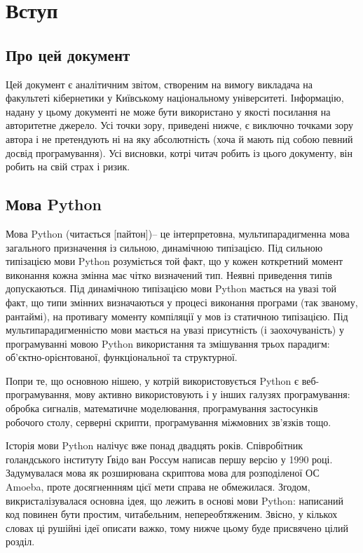 \documentclass[a4paper, 12pt]{article}
\begin{document}
\section{Вступ}

\subsection{Про цей документ}

Цей документ є аналітичним звітом, створеним на вимогу викладача на факультеті кібернетики у Київському національному університеті. Інформацію, надану у цьому документі не може бути використано у якості посилання на авторитетне джерело. Усі точки зору, приведені нижче, є виключно точками зору автора і не претендують ні на яку абсолютність (хоча й мають під собою певний досвід програмування). Усі висновки, котрі читач робить із цього документу, він робить на свій страх і ризик. 

\subsection{Мова Python}

Мова Python (читається [пайтон])-- це інтерпретовна, мультипарадигменна мова загального призначення із сильною, динамічною типізацією. Під сильною типізацією мови Python розуміється той факт, що у кожен коткретний момент виконання кожна змінна має чітко визначений тип. Неявні приведення типів допускаються. Під динамічною типізацією мови Python мається на увазі той факт, що типи змінних визначаються у процесі виконання програми (так званому, рантаймі), на противагу моменту компіляції у мов із статичною типізацією. Під мультипарадигменністю мови мається на увазі присутність (і заохочуваність) у програмуванні мовою Python використання та змішування трьох парадигм: об'єктно-орієнтованої, функціональної та структурної.

Попри те, що основною нішею, у котрій використовується Python є веб-програмування, мову активно використовують і у інших галузях програмування: обробка сигналів, математичне моделювання, програмування застосунків робочого столу, серверні скрипти, програмування міжмовних зв'язків тощо.

Історія мови Python налічує вже понад двадцять років. Співробітник голандського інституту Ґвідо ван Россум написав першу версію у 1990 році. Задумувалася мова як розширювана скриптова мова для розподіленої ОС Amoeba, проте досягненнням цієї мети справа не обмежилася. Згодом, викристалізувалася основна ідея, що лежить в основі мови Python: написаний код повинен бути простим, читабельним, непереобтяженим. Звісно, у кількох словах ці рушійні ідеї описати важко, тому нижче цьому буде присвячено цілий розділ.
\end{document}
